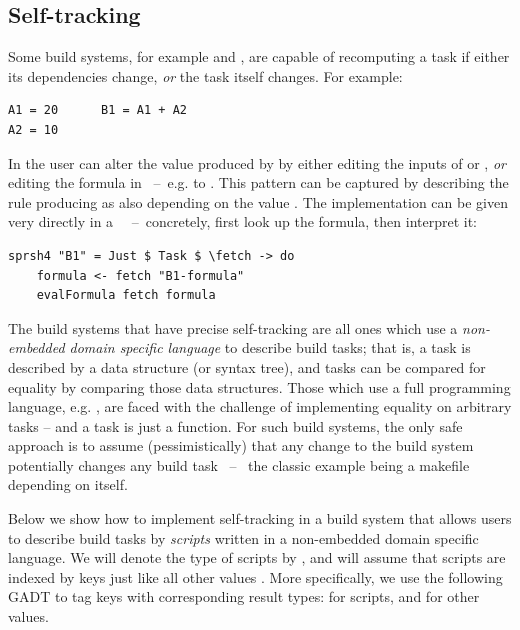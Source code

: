 \subsection{Self-tracking}\label{sec-tracking-aspects}

Some build systems, for example \Excel and \Ninja, are capable of recomputing a
task if either its dependencies change, \emph{or} the task itself changes. For
example:

\vspace{0.5mm}
\begin{verbatim}
A1 = 20      B1 = A1 + A2
A2 = 10
\end{verbatim}
\vspace{0.5mm}

\noindent
In \Excel the user can alter the value produced by  by either editing
the inputs of  or , \emph{or} editing the formula in
~--~e.g. to . This pattern can be captured by describing
the rule producing  as also depending on the value .
The implementation can be given very directly in a
~~--~concretely, first look up the formula, then interpret
it:

\vspace{1mm}
\begin{verbatim}
sprsh4 "B1" = Just $ Task $ \fetch -> do
    formula <- fetch "B1-formula"
    evalFormula fetch formula
\end{verbatim}
\vspace{1mm}

\noindent
The build systems that have precise self-tracking are all ones which
use a \emph{non-embedded domain specific language} to describe build
tasks; that is, a task is described by a data structure (or syntax
tree), and tasks can be compared for equality by comparing those data
structures. Those which use a full programming language, e.g. \Shake,
are faced with the challenge of implementing equality on arbitrary
tasks -- and a task is just a function.  For such build systems, the
only safe approach is to assume (pessimistically) that any
change to the build system potentially changes any build task ~--~ the
classic example being a makefile depending on itself.

Below we show how to implement self-tracking in a build system that allows users
to describe build tasks by \emph{scripts} written in a non-embedded domain
specific language. We will denote the type of scripts by , and will assume
that scripts are indexed by keys  just like all other values . More
specifically, we use the following GADT to tag keys  with corresponding
result types:  for scripts, and  for other values.

